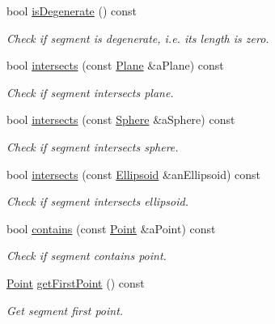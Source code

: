 \begin{DoxyCompactItemize}
bool \hyperlink{classlibrary_1_1math_1_1geom_1_1d3_1_1objects_1_1_segment_a11324bd27db3ef9d931fdee763246759}{is\+Degenerate} () const
\begin{DoxyCompactList}\small\item\em Check if segment is degenerate, i.\+e. its length is zero. \end{DoxyCompactList}\item 
bool \hyperlink{classlibrary_1_1math_1_1geom_1_1d3_1_1objects_1_1_segment_a8ba39afb970cc57b1e11ebd5eaf82db4}{intersects} (const \hyperlink{classlibrary_1_1math_1_1geom_1_1d3_1_1objects_1_1_plane}{Plane} \&a\+Plane) const
\begin{DoxyCompactList}\small\item\em Check if segment intersects plane. \end{DoxyCompactList}\item 
bool \hyperlink{classlibrary_1_1math_1_1geom_1_1d3_1_1objects_1_1_segment_a9919183ce212b474e418685db50891fc}{intersects} (const \hyperlink{classlibrary_1_1math_1_1geom_1_1d3_1_1objects_1_1_sphere}{Sphere} \&a\+Sphere) const
\begin{DoxyCompactList}\small\item\em Check if segment intersects sphere. \end{DoxyCompactList}\item 
bool \hyperlink{classlibrary_1_1math_1_1geom_1_1d3_1_1objects_1_1_segment_af6d7eb00a6886d190c03e8b8e4220f33}{intersects} (const \hyperlink{classlibrary_1_1math_1_1geom_1_1d3_1_1objects_1_1_ellipsoid}{Ellipsoid} \&an\+Ellipsoid) const
\begin{DoxyCompactList}\small\item\em Check if segment intersects ellipsoid. \end{DoxyCompactList}\item 
bool \hyperlink{classlibrary_1_1math_1_1geom_1_1d3_1_1objects_1_1_segment_aabdbcd6bbfbe9350fe53f1b3563b5652}{contains} (const \hyperlink{classlibrary_1_1math_1_1geom_1_1d3_1_1objects_1_1_point}{Point} \&a\+Point) const
\begin{DoxyCompactList}\small\item\em Check if segment contains point. \end{DoxyCompactList}\item 
\hyperlink{classlibrary_1_1math_1_1geom_1_1d3_1_1objects_1_1_point}{Point} \hyperlink{classlibrary_1_1math_1_1geom_1_1d3_1_1objects_1_1_segment_aa51ef3e713b4041f852db4201bbf7821}{get\+First\+Point} () const
\begin{DoxyCompactList}\small\item\em Get segment first point. \end{DoxyCompactList}\item 

\end{DoxyCompactItemize}
